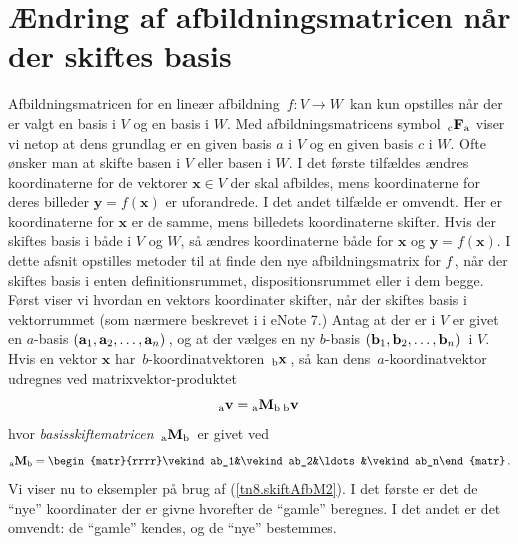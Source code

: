 \section{Ændring af afbildningsmatricen når der skiftes basis}\label{tn8.AfsnitBasisskifte}

Afbildningsmatricen for en lineær afbildning $\,f:V\rightarrow W\,$ kan kun opstilles når der er valgt en basis i $V$ og en basis i $W$. Med afbildningsmatricens symbol $\,{_\mathrm{c}\mathbf{F}_\mathrm{a}}$ viser vi netop at dens grundlag er  en given basis $a$ i $V$ og en given basis $c$ i $W$.\bs
Ofte ønsker man at skifte basen i $V$ eller basen i $W$. I det første tilfældes ændres koordinaterne for de vektorer $\mathbf x\in V$ der skal afbildes, mens koordinaterne for deres billeder $\mathbf y = f(\mathbf x)$ er uforandrede. I det andet tilfælde er omvendt. Her er koordinaterne for $\mathbf x$ er de samme, mens billedets koordinaterne skifter. Hvis der skiftes basis i både i $V$ og $W$, så ændres koordinaterne både for $\mathbf x$ og $\mathbf y =f(\mathbf x)$.\bs
I dette afsnit opstilles metoder til at finde den nye  afbildningsmatrix for $f\,$, når der skiftes basis i enten definitionsrummet, dispositionsrummet eller i dem begge. Først viser vi hvordan en vektors koordinater skifter, når der skiftes basis i vektorrummet (som nærmere beskrevet i  i eNote 7.)\bs
Antag at der er i $V$ er givet en $a$-basis $(\mathbf{a}_1,\mathbf{a}_2,\ldots,\mathbf{a}_n)\,$, og at der vælges en ny $b$-basis $(\mathbf{b}_1,\mathbf{b}_2,\ldots,\mathbf{b}_n)\,$ i $V$. Hvis en vektor $\mathbf x$ har $\,b$-koordinatvektoren $\,{_\mathrm{b}\mathbf{x}}\,$, så kan dens $\,a$-koordinatvektor udregnes ved matrixvektor-produktet 
\begin{equation}\label{tn8.skiftAfbM1}
{_\mathrm{a}\mathbf{v}} = {_\mathrm{a}\mathbf{M}_\mathrm{b}}\,{_\mathrm{b}\mathbf{v}}\,
\end{equation}
hvor \textit{basisskiftematricen} $\,{_\mathrm{a}\mathbf{M}_\mathrm{b}}\,$ er givet ved
\begin{equation}\label{tn8.skiftAfbM2}
\matind aMb=\begin{matr}{rrrr}\vekind ab_1&\vekind ab_2&\ldots&\vekind ab_n\end{matr}\,.
\end{equation}
Vi viser nu to eksempler på brug af (\ref{tn8.skiftAfbM2}). I det første er det de ``nye'' koordinater der er givne hvorefter de ``gamle'' beregnes. I det andet er det omvendt: de ``gamle'' kendes, og de ``nye'' bestemmes.


